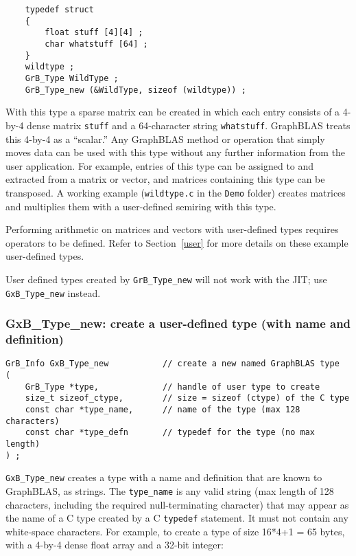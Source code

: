 \documentclass[12pt]{article}
\begin{document}
    {\footnotesize
    \begin{verbatim}
    typedef struct
    {
        float stuff [4][4] ;
        char whatstuff [64] ;
    }
    wildtype ;
    GrB_Type WildType ;
    GrB_Type_new (&WildType, sizeof (wildtype)) ; \end{verbatim} }

With this type a sparse matrix can be created in which each entry consists of a
4-by-4 dense matrix \verb'stuff' and a 64-character string \verb'whatstuff'.
GraphBLAS treats this 4-by-4 as a ``scalar.'' Any GraphBLAS method or operation
that simply moves data can be used with this type without any further
information from the user application.  For example, entries of this type can
be assigned to and extracted from a matrix or vector, and matrices containing
this type can be transposed.  A working example (\verb'wildtype.c'
in the \verb'Demo' folder) creates matrices and multiplies them with
a user-defined semiring with this type.

Performing arithmetic on matrices and vectors with user-defined types requires
operators to be defined.  Refer to Section~\ref{user} for more details on these
example user-defined types.

User defined types created by \verb'GrB_Type_new' will not work with
the JIT; use \verb'GxB_Type_new' instead.

\subsubsection{{\sf GxB\_Type\_new:} create a user-defined type (with name and definition)}
\label{type_new_named}

\begin{mdframed}[userdefinedwidth=6in]
{\footnotesize
\begin{verbatim}
GrB_Info GxB_Type_new           // create a new named GraphBLAS type
(
    GrB_Type *type,             // handle of user type to create
    size_t sizeof_ctype,        // size = sizeof (ctype) of the C type
    const char *type_name,      // name of the type (max 128 characters)
    const char *type_defn       // typedef for the type (no max length)
) ;
\end{verbatim}
}\end{mdframed}

\verb'GxB_Type_new' creates a type with a name and definition that are known to
GraphBLAS, as strings.  The \verb'type_name' is any valid string (max length of 128
characters, including the required null-terminating character) that may
appear as the name of a C type created by a C \verb'typedef' statement.  It must
not contain any white-space characters.  For example, to create a type of size
16*4+1 = 65 bytes, with a 4-by-4 dense float array and a 32-bit integer:
\end{document}
